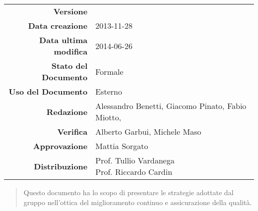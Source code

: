 

\newcommand{\Versione}{\versionePianoDiQualifica{}}	%
\newcommand{\Data}{2013-11-28}						%
\newcommand{\DataUltimaModifica}{2014-06-26}
\newcommand{\TipoDocumento}{Piano di Qualifica}		%





\begin{center}
\begin{tabular}{r|l}
\textbf{Versione} & \Versione{} \\
\textbf{Data creazione} & \Data{} \\
\textbf{Data ultima modifica} & \DataUltimaModifica{} \\
\textbf{Stato del Documento} & Formale \\		%
\textbf{Uso del Documento} & Esterno \\			%
\textbf{Redazione} & Alessandro Benetti, Giacomo Pinato, Fabio Miotto,\\			%
\textbf{Verifica} & Alberto Garbui, Michele Maso\\%
\textbf{Approvazione} & Mattia Sorgato\\				%
\textbf{Distribuzione} & \parbox[t]{4cm}{Prof. Tullio Vardanega \\ Prof. Riccardo Cardin \\ \Prop{} }
\end{tabular}
\end{center}

\vspace{0.05in}

\begin{abstract}
\begin{center}
Questo documento ha lo scopo di presentare le strategie adottate dal gruppo \NomeGruppo{} nell'ottica del miglioramento continuo e assicurazione della qualità.
\end{center}
\end{abstract}

